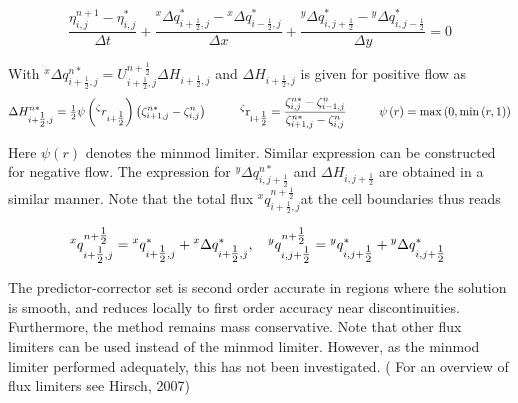 \documentclass{article}
\begin{document}
\noindent 
\begin{equation} \label{ZEqnNum452818} 
\frac{\eta _{i,j}^{n+1} -\eta _{i,j}^{*} }{\Delta t} +\frac{{}^{x} \Delta q_{i+{\tfrac{1}{2}} ,j}^{*} -{}^{x} \Delta q_{i-{\tfrac{1}{2}} ,j}^{*} }{\Delta x} +\frac{{}^{y} \Delta q_{i,j+{\tfrac{1}{2}} }^{*} -{}^{y} \Delta q_{i,j-{\tfrac{1}{2}} }^{*} }{\Delta y} =0 
\end{equation} 


\noindent With ${}^{x} \Delta q_{i+{\tfrac{1}{2}} ,j}^{n*} =U_{i+{\tfrac{1}{2}} ,j}^{n+{\tfrac{1}{2}} } \Delta H_{i+{\tfrac{1}{2}} ,j}^{} $ and $\Delta H_{i+{\tfrac{1}{2}} ,j}^{} $ is given for positive flow as
\begin{equation} \label{ZEqnNum654284} 
\Delta H_{i+{\tfrac{1}{2}} ,j}^{n*} ={\tfrac{1}{2}} \psi \left(^{\zeta } r_{i+{\tfrac{1}{2}} } \right)\left(\zeta _{i+1,j}^{n*} -\zeta _{i,j}^{n} \right){\rm \; \; \; \; \; \; \; \; \; \; }^{\zeta } {\rm r}_{{\rm i+}{\tfrac{{\rm 1}}{{\rm 2}}} } =\frac{\zeta _{i,j}^{n*} -\zeta _{i-1,j}^{n} }{\zeta _{i+1,j}^{n*} -\zeta _{i,j}^{n} } {\rm \; \; \; \; \; \; \; \; \; \; }\psi \left(r\right)=\max \left(0,\min \left(r,1\right)\right) 
\end{equation} 


\noindent Here $\psi \left(r\right)$ denotes the minmod limiter. Similar expression can be constructed for negative flow. The expression for ${}^{y} \Delta q_{i,j+{\tfrac{1}{2}} }^{n*} $ and $\Delta H_{i,j+{\tfrac{1}{2}} }^{} $ are obtained in a similar manner. Note that the total flux ${}^{x} q_{i+{\tfrac{1}{2}} ,j}^{n+{\tfrac{1}{2}} } $at the cell boundaries thus reads

\noindent 
\begin{equation} \label{ZEqnNum673353} 
{}^{x} q_{i+{\tfrac{1}{2}} ,j}^{n+{\tfrac{1}{2}} } ={}^{x} q_{i+{\tfrac{1}{2}} ,j}^{*} +{}^{x} \Delta q_{i+{\tfrac{1}{2}} ,j}^{*} {\rm ,\; \; \; \; }{}^{y} q_{i,j+{\tfrac{1}{2}} }^{n+{\tfrac{1}{2}} } ={}^{y} q_{i,j+{\tfrac{1}{2}} }^{*} +{}^{y} \Delta q_{i,j+{\tfrac{1}{2}} }^{*} {\rm \; } 
\end{equation} 


\noindent The predictor-corrector set is second order accurate in regions where the solution is smooth, and reduces locally to first order accuracy near discontinuities. Furthermore, the method remains mass conservative. Note that other flux limiters can be used instead of the minmod limiter. However, as the minmod limiter performed adequately, this has not been investigated. ( For an overview of flux limiters see Hirsch, 2007)
\end{document}
